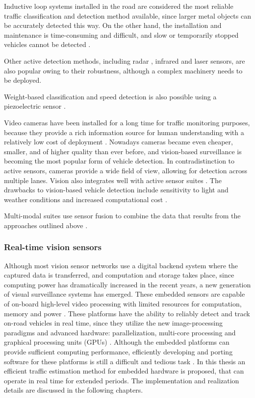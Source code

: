 Inductive loop systems installed in the road are considered the most reliable traffic classification and detection method available, since larger metal objects can be accurately detected this way. 
On the other hand, the installation and maintenance is time-consuming and difficult, and slow or temporarily stopped vehicles cannot be detected \cite{Diamond, Zhang2016}.

Other active detection methods, including radar \cite{DeepBlue}, infrared \cite{Swarco, Hussain1995, Ghazal2016} and laser \cite{SICK, Gallego2009} sensors, are also popular owing to their robustness, although a complex machinery needs to be deployed.

Weight-based classification and speed detection is also possible using a piezoelectric sensor \cite{Te, Rivas2017}.

Video cameras have been installed for a long time for traffic monitoring purposes, because they provide a rich information source for human understanding with a relatively low cost of deployment \cite{Tian2011, Buch2011, VideoSurveillance, LaSemaforica}.
Nowadays cameras became even cheaper, smaller, and of higher quality than ever before, and vision-based surveillance is becoming the most popular form of vehicle detection.
In contradistinction to active sensors, cameras provide a wide field of view, allowing for detection across multiple lanes. 
Vision also integrates well with active sensor suites \cite{Garcia2012}.
The drawbacks to vision-based vehicle detection include sensitivity to light and weather conditions and increased computational cost \cite{Sivaraman2013}.

Multi-modal suites use sensor fusion to combine the data that results from the approaches outlined above \cite{Swarco}.

\subsubsection{Real-time vision sensors}
Although most vision sensor networks use a digital backend system where the captured data is transferred, and computation and storage takes place, since computing power has dramatically increased in the recent years, a new generation of visual surveillance systems has emerged.
These embedded sensors are capable of on-board high-level video processing with limited resources for computation, memory and power \cite{Bramberger2004}.
These platforms have the ability to reliably detect and track on-road vehicles in real time, since they utilize the new image-processing paradigms and advanced hardware: parallelization, multi-core processing and graphical processing units (GPUs) \cite{Sivaraman2013}.
Although the embedded platforms can provide sufficient computing performance, efficiently developing and porting software for these platforms is still a difficult and tedious task \cite{Bramberger2004}.
In this thesis an efficient traffic estimation method for embedded hardware is proposed, that can operate in real time for extended periods.
The implementation and realization details are discussed in the following chapters.

